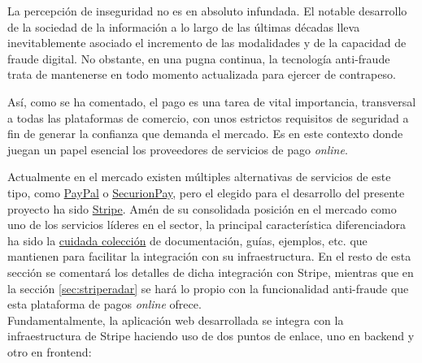 \documentclass[a4paper]{article}
\begin{document}
    La percepción de inseguridad no es en absoluto infundada. El notable desarrollo de la sociedad de la información a lo largo de las últimas décadas lleva inevitablemente asociado el incremento de las modalidades y de la capacidad de fraude digital. No obstante, en una pugna continua, la tecnología anti-fraude trata de mantenerse en todo momento actualizada para ejercer de contrapeso.
    
    Así, como se ha comentado, el pago es una tarea de vital importancia, transversal a todas las plataformas de comercio, con unos estrictos requisitos de seguridad a fin de generar la confianza que demanda el mercado. Es en este contexto donde juegan un papel esencial los proveedores de servicios de pago \emph{online}.
    
    Actualmente en el mercado existen múltiples alternativas de servicios de este tipo, como \href{https://www.paypal.com/}{PayPal} o \href{https://securionpay.com/}{SecurionPay}, pero el elegido para el desarrollo del presente proyecto ha sido \href{https://stripe.com/}{Stripe}. Amén de su consolidada posición en el mercado como uno de los servicios líderes en el sector, la principal característica diferenciadora ha sido la \href{https://stripe.com/docs}{cuidada colección} de documentación, guías, ejemplos, etc. que mantienen para facilitar la integración con su infraestructura. En el resto de esta sección se comentará los detalles de dicha integración con Stripe, mientras que en la sección \ref{sec:striperadar} se hará lo propio con la funcionalidad anti-fraude que esta plataforma de pagos \emph{online} ofrece.
    \\
    
    Fundamentalmente, la aplicación web desarrollada se integra con la infraestructura de Stripe haciendo uso de dos puntos de enlace, uno en backend y otro en frontend:
    
\end{document}
